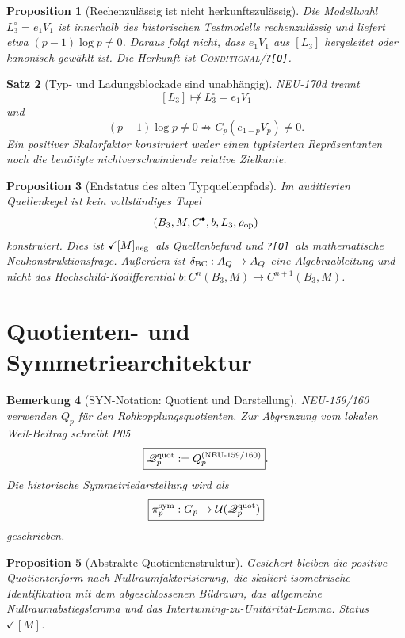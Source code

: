 \documentclass[11pt,a4paper]{amsart}
\newtheorem{theorem}{Satz}[section]
\newtheorem{proposition}[theorem]{Proposition}
\newtheorem{remark}[theorem]{Bemerkung}
\newcommand{\stM}{\ensuremath{\checkmark[M]}}
\newcommand{\stMneg}{\ensuremath{\checkmark[M]_{\rm neg}}}
\newcommand{\Open}{\texttt{?[O]}}
\newcommand{\Conditional}{\textsc{Conditional}}
\begin{document}
\begin{proposition}[Rechenzulässig ist nicht herkunftszulässig]
Die Modellwahl $L_3^\circ=e_1V_1$ ist innerhalb des historischen Testmodells
rechenzulässig und liefert etwa $(p-1)\log p\neq0$. Daraus folgt nicht, dass
$e_1V_1$ aus $[L_3]$ hergeleitet oder kanonisch gewählt ist. Die Herkunft ist
\Conditional/\Open.
\end{proposition}

\begin{theorem}[Typ- und Ladungsblockade sind unabhängig]
NEU-170d trennt
\[
[L_3]\not\longmapsto L_3^\circ=e_1V_1
\]
und
\[
(p-1)\log p\neq0
\not\Longrightarrow C_p(e_{1-p}V_p)\neq0.
\]
Ein positiver Skalarfaktor konstruiert weder einen typisierten Repräsentanten
noch die benötigte nichtverschwindende relative Zielkante.
\end{theorem}

\begin{proposition}[Endstatus des alten Typquellenpfads]
Im auditierten Quellenkegel ist kein vollständiges Tupel
\[
(B_3,M,C^\bullet,b,L_3,\rho_{\rm op})
\]
konstruiert. Dies ist \stMneg\ als Quellenbefund und \Open\ als mathematische
Neukonstruktionsfrage. Außerdem ist $\delta_{\rm BC}:A_Q\to A_Q$ eine
Algebraableitung und nicht das Hochschild-Kodifferential
$b:C^n(B_3,M)\to C^{n+1}(B_3,M)$.
\end{proposition}

\section{Quotienten- und Symmetriearchitektur}

\begin{remark}[SYN-Notation: Quotient und Darstellung]
NEU-159/160 verwenden $Q_p$ für den Rohkopplungsquotienten. Zur Abgrenzung
vom lokalen Weil-Beitrag schreibt P05
\[
\boxed{\mathscr Q_p^{\rm quot}:=Q_p^{(\mathrm{NEU\text{-}159/160)}}}.
\]
Die historische Symmetriedarstellung wird als
\[
\boxed{\pi_p^{\rm sym}:G_p\to\mathcal U(\mathscr Q_p^{\rm quot})}
\]
geschrieben.
\end{remark}

\begin{proposition}[Abstrakte Quotientenstruktur]
Gesichert bleiben die positive Quotientenform nach Nullraumfaktorisierung,
die skaliert-isometrische Identifikation mit dem abgeschlossenen Bildraum,
das allgemeine Nullraumabstiegslemma und das Intertwining-zu-Unitärität-Lemma.
Status \stM.
\end{proposition}
\end{document}
